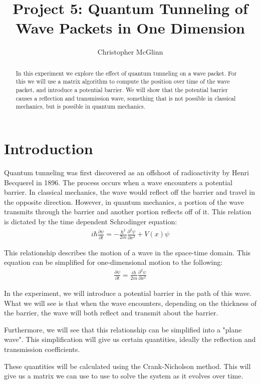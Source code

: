 \documentclass[pra,twocolumn,showpacs,amsmath,amssymb]{revtex4-2}
\begin{document}
\title{Project 5: Quantum Tunneling of Wave Packets in One Dimension}


\author{Christopher McGlinn}

\begin{abstract}
In this experiment we explore the effect of quantum tunneling on a wave packet. For this we will use a matrix algorithm to compute the position over time of the wave packet, and introduce a potential barrier. We will show that the potential barrier causes a reflection and transmission wave, something that is not possible in classical mechanics, but is possible in quantum mechanics.
\end{abstract}



\maketitle

\section{Introduction} \label{sec:intro}

Quantum tunneling was first discovered as an offshoot of radioactivity by Henri Becquerel in 1896. The process occurs when a wave encounters a potential barrier. In classical mechanics, the wave would reflect off the barrier and travel in the opposite direction. However, in quantum mechanics, a portion of the wave transmits through the barrier and another portion reflects off of it. This relation is dictated by the time dependent Schrodinger equation:
\begin{eqnarray}
i\hbar \frac{\partial \psi}{\partial t} = - \frac{\hbar^2}{2m} \frac{\partial^2 \psi}{\partial x^2} + V(x)\psi
\end{eqnarray}
\par This relationship describes the motion of a wave in the space-time domain. This equation can be simplified for one-dimensional motion to the following:
\begin{eqnarray}
\frac{\partial \psi}{\partial t} = \frac{i\hbar}{2m} \frac{\partial^2 \psi}{\partial x^2}
\end{eqnarray}
\par In the experiment, we will introduce a potential barrier in the path of this wave. What we will see is that when the wave encounters, depending on the thickness of the barrier, the wave will both reflect and transmit about the barrier.
\par Furthermore, we will see that this relationship can be simplified into a "plane wave". This simplification will give us certain quantities, ideally the reflection and transmission coefficients.
\par These quantities will be calculated using the Crank-Nicholson method. This will give us a matrix we can use to use to solve the system as it evolves over time.
\end{document}
